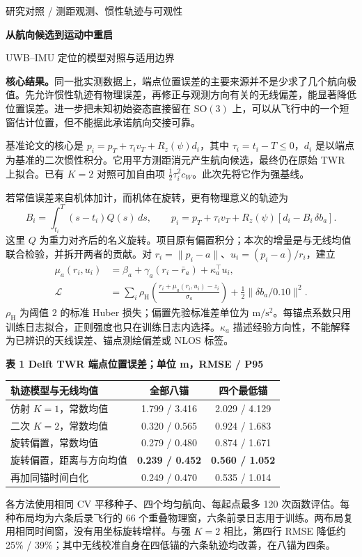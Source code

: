 \documentclass[UTF8,10pt,a4paper,fontset=windows]{ctexart}
\newcommand{\parttitle}[1]{\vspace{3pt}{\Large\bfseries\color{accent}#1}\par\vspace{3pt}}
\newcommand{\SO}{\mathrm{SO}(3)}
\newcommand{\Hub}{\rho_{\mathrm H}}
\begin{document}
{\small\color{accent}研究对照 \quad / \quad 测距观测、惯性轨迹与可观性}\par
{\huge\bfseries\color{ink}从航向候选到运动中重启}\par
{\large UWB--IMU 定位的模型对照与适用边界}\par
\medskip
\textbf{核心结果。}同一批实测数据上，端点位置误差的主要来源并不是少求了几个航向极值。先允许惯性轨迹有物理误差，再修正与观测方向有关的无线偏差，能显著降低位置误差。进一步把未知初始姿态直接留在 $\SO$ 上，可以从飞行中的一个短窗估计位置，但不能据此承诺航向交接可靠。

\parttitle{1 \quad 有静止前缀：联合改进两个模型}
基准论文的核心是 $p_i=p_T+\tau_i v_T+R_z(\psi)d_i$，其中 $\tau_i=t_i-T\le0$，$d_i$ 是以端点为基准的二次惯性积分。它用平方测距消元产生航向候选，最终仍在原始 TWR 上拟合。已有 $K=2$ 对照可加自由项 $\tfrac12\tau_i^2c_W$。此次先将它作为强基线。

若常值误差来自机体加计，而机体在旋转，更有物理意义的轨迹为
\begin{equation}
 B_i=\int_{t_i}^{T}(s-t_i)Q(s)\,ds,\qquad
 p_i=p_T+\tau_i v_T+R_z(\psi)[d_i-B_i\,\delta b_a].
\end{equation}
这里 $Q$ 为重力对齐后的名义旋转。项目原有偏置积分；本次的增量是与无线均值联合检验，并拆开两者的贡献。对 $r_i=\|p_i-a\|$、$u_i=(p_i-a)/r_i$，建立
\begin{align}
 \mu_a(r_i,u_i)&=\beta_a+\gamma_a(r_i-\bar r_a)+\kappa_a^\top u_i,\\
 \mathcal L&=\sum_i\Hub\!\left(\frac{r_i+\mu_a(r_i,u_i)-z_i}{\sigma_a}\right)
       +\frac12\|\delta b_a/0.10\|^2 .
\end{align}
$\Hub$ 为阈值 $2$ 的标准 Huber 损失；偏置先验标准差单位为 $\mathrm{m/s^2}$。每锚点系数只用训练日志拟合，正则强度也只在训练日志内选择。$\kappa_a$ 描述经验方向性，不能解释为已辨识的天线误差、锚点测绘偏差或 NLOS 标签。

\begin{center}
{\small\bfseries 表 1 \quad Delft TWR 端点位置误差；单位 m，RMSE / P95}\par
\smallskip\begin{tabular}{lcc}
\toprule 轨迹模型与无线均值 & 全部八锚 & 四个最低锚\\\midrule
仿射 $K=1$，常数均值 & 1.799 / 3.416 & 2.029 / 4.129\\
二次 $K=2$，常数均值 & 0.320 / 0.565 & 0.924 / 1.683\\
旋转偏置，常数均值 & 0.279 / 0.480 & 0.874 / 1.671\\
旋转偏置，距离与方向均值 & \textbf{0.239 / 0.452} & \textbf{0.560 / 1.052}\\
再加同锚时间白化 & 0.249 / 0.470 & 0.535 / 1.014\\\bottomrule
\end{tabular}\end{center}
各方法使用相同 CV 平移种子、四个均匀航向、每起点最多 120 次函数评估。每种布局均为六条后录飞行的 66 个重叠物理窗，六条前录日志用于训练。两布局复用相同时间窗，没有用坐标旋转增样。与强 $K=2$ 相比，第四行 RMSE 降低约 25\% / 39\%；其中无线校准自身在四低锚的六条轨迹均改善，在八锚为四条。
\end{document}

